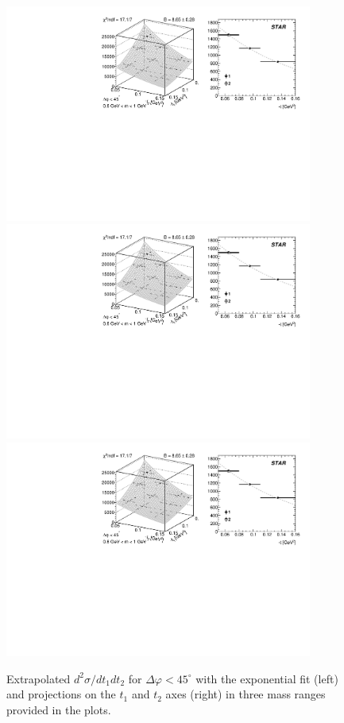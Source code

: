 \begin{figure}%
\centering
\includegraphics[width=0.9\textwidth,page=1]{graphics/physicsResults/SlopeExtraction.pdf}\\[7pt]
\includegraphics[width=0.9\textwidth,page=2]{graphics/physicsResults/SlopeExtraction.pdf}\\[7pt]
\includegraphics[width=0.9\textwidth,page=3]{graphics/physicsResults/SlopeExtraction.pdf}
%
\caption{Extrapolated $d^{2}\sigma/dt_{1}dt_{2}$ for $\Delta\varphi<45^{\circ}$ with the exponential fit (left) and projections on the $t_{1}$ and $t_{2}$ axes (right) in three mass ranges provided in the plots.}
\label{fig:slope_1}
\end{figure}


